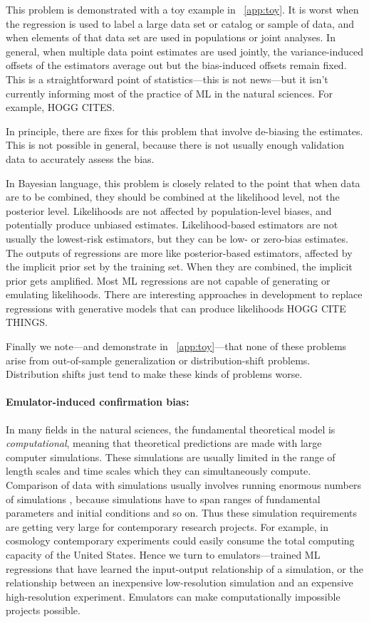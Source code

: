 \documentclass[11pt]{article}
\begin{document}
This problem is demonstrated with a toy example in \appendixname~\ref{app:toy}.
It is worst when the regression is used to label a large data set or catalog or sample of data,
and when elements of that data set are used in populations or joint analyses.
In general, when multiple data point estimates are used jointly, the variance-induced offsets of the estimators average out but the bias-induced offsets remain fixed.
This is a straightforward point of statistics---this is not news---but it isn't currently informing most of the practice of ML in the natural sciences.
For example, HOGG CITES.

In principle, there are fixes for this problem that involve de-biasing the estimates.
This is not possible in general, because there is not usually enough validation data to accurately assess the bias.

In Bayesian language, this problem is closely related to the point that when data are to be combined, they should be combined at the likelihood level, not the posterior level.
Likelihoods are not affected by population-level biases, and potentially produce unbiased estimates.
Likelihood-based estimators are not usually the lowest-risk estimators, but they can be low- or zero-bias estimates.
The outputs of regressions are more like posterior-based estimators, affected by the implicit prior set by the training set.
When they are combined, the implicit prior gets amplified.
Most ML regressions are not capable of generating or emulating likelihoods.
There are interesting approaches in development to replace regressions with generative models that can produce likelihoods HOGG CITE THINGS.

Finally we note---and demonstrate in \appendixname~\ref{app:toy}---that none of these problems arise from out-of-sample generalization or distribution-shift problems.
Distribution shifts just tend to make these kinds of problems worse.

\paragraph{Emulator-induced confirmation bias:}
In many fields in the natural sciences, the fundamental theoretical model is \emph{computational}, meaning that theoretical predictions are made with large computer simulations.
These simulations are usually limited in the range of length scales and time scales which they can simultaneously compute.
Comparison of data with simulations usually involves running enormous numbers of simulations \cite{sbi}, because simulations have to span ranges of fundamental parameters and initial conditions and so on.
Thus these simulation requirements are getting very large for contemporary research projects.
For example, in cosmology contemporary experiments could easily consume the total computing capacity of the United States.
Hence we turn to emulators---trained ML regressions that have learned the input-output relationship of a simulation, or the relationship between an inexpensive low-resolution simulation and an expensive high-resolution experiment.
Emulators can make computationally impossible projects possible.
\end{document}
